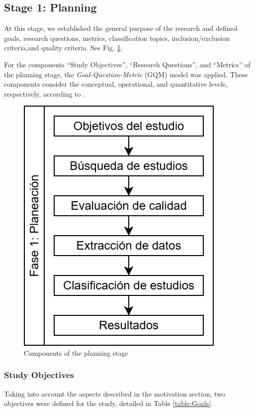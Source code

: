 \subsection{Stage 1: Planning}\label{sec:planeacion}

At this stage, we established the general purpose of the research and defined goals, research questions, metrics, classification topics, inclusion/exclusion criteria,and quality criteria. See Fig. \ref{fig:PlanningStageOverview}.

For the components ``Study Objectives'', ``Research Questions'', and ``Metrics'' of the planning stage, the {\itshape Goal-Question-Metric} (GQM) model \cite{basili1992software, caldiera1994goal} was applied. These components consider the conceptual, operational, and quantitative levels, respectively, according to \cite{Sepúlveda202141}. %

\begin{figure}[htbp]
	\centering
	\includegraphics[scale=0.4]{resources/figures/sms-Etapa-1 overview.drawio.png}
	\caption{Components of the planning stage}
	\label{fig:PlanningStageOverview}
\end{figure}

\subsubsection{Study Objectives}
Taking into account the aspects described in the motivation section, two objectives were defined for the study, detailed in Table \ref{table:Goals}.

